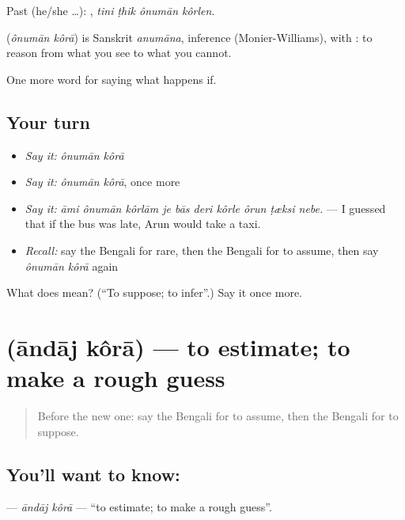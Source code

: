 Past (he/she …):    , \emph{tini ṭhik ônumān kôrlen}.

\begin{cousinweb}
\textbf{ } (\emph{ônumān kôrā}) is Sanskrit \emph{anumāna}, inference (Monier-Williams), with : to reason from what you see to what you cannot.
\end{cousinweb}

\begin{grammarlens}[title={What you've built}]
One more word for saying what happens if.
\end{grammarlens}

\subsection*{Your turn}
\begin{itemize}
\raggedright
  \item \emph{Say it:} \emph{ônumān kôrā}
  \item \emph{Say it:} \emph{ônumān kôrā}, once more
  \item \emph{Say it:} \emph{āmi ônumān kôrlām je bās deri kôrle ôrun ṭæksi nebe.} — I guessed that if the bus was late, Arun would take a taxi.
  \item \emph{Recall:} say the Bengali for rare, then the Bengali for to assume, then say \emph{ônumān kôrā} again
\end{itemize}

\begin{tcolorbox}[breakable,colback=teal!4,colframe=teal!35!black,title={Before you move on}]
What does   mean? (\textquotedblleft{}To suppose; to infer\textquotedblright{}.) Say it once more.
\end{tcolorbox}
\section[\texorpdfstring{\bn{আন্দাজ} \bn{করা} (āndāj kôrā)}{আন্দাজ করা (āndāj kôrā)}]{  (āndāj kôrā) — to estimate; to make a rough guess}

\label{lesson:BN-C367-andaj-kora}



\begin{quote}
Before the new one: say the Bengali for to assume, then the Bengali for to suppose.
\end{quote}

\subsection*{You'll want to know:  }
\textbf{ } — \emph{āndāj kôrā} — \textquotedblleft{}to estimate; to make a rough guess\textquotedblright{}.

